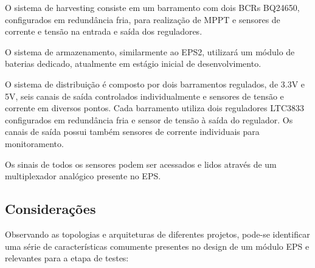 O sistema de harvesting consiste em um barramento com dois \gls{BCR}s BQ24650, configurados em redundância fria, para realização de \gls{MPPT} e sensores de corrente e tensão na entrada e saída dos reguladores.

O sistema de armazenamento, similarmente ao \gls{EPS2}, utilizará um módulo de baterias dedicado, atualmente em estágio inicial de desenvolvimento.

O sistema de distribuição é composto por dois barramentos regulados, de 3.3V e 5V, seis canais de saída controlados individualmente e sensores de tensão e corrente em diversos pontos.
Cada barramento utiliza dois reguladores LTC3833 configurados em redundância fria e sensor de tensão à saída do regulador. Os canais de saída possui também sensores de corrente individuais para monitoramento.

Os sinais de todos os sensores podem ser acessados e lidos através de um multiplexador analógico presente no \gls{EPS}.




\subsection{Considerações}\label{sec:consideracoes-arq-top}

Observando as topologias e arquiteturas de diferentes projetos, pode-se identificar uma série de características comumente presentes no design de um módulo EPS e relevantes para a etapa de testes:

